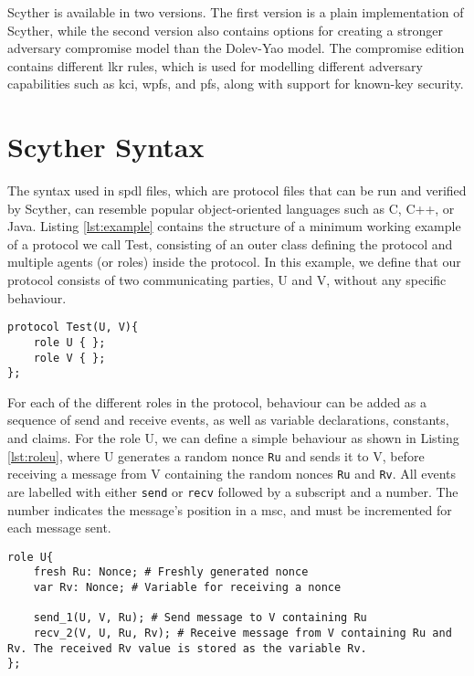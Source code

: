 Scyther is available in two versions. The first version is a plain implementation of Scyther, while the second version also contains options for creating a stronger adversary compromise model than the Dolev-Yao model. The compromise edition contains different \gls{lkr} rules, which is used for modelling different adversary capabilities such as \gls{kci}, \gls{wpfs}, and \gls{pfs}, along with support for known-key security. 


\section{Scyther Syntax}


The syntax used in \gls{spdl} files, which are protocol files that can be run and verified by Scyther, can resemble popular object-oriented languages such as C, C++, or Java. Listing \ref{lst:example} contains the structure of a minimum working example of a protocol we call Test, consisting of an outer class defining the protocol and multiple agents (or roles) inside the protocol. In this example, we define that our protocol consists of two communicating parties, U and V, without any specific behaviour.\newline

\begin{lstlisting}[caption={Example of the structure of a protocol modelled in Scyther, consisting of roles with different behaviours.}, label={lst:example}]
protocol Test(U, V){
	role U { };
	role V { };  
};
\end{lstlisting}

For each of the different roles in the protocol, behaviour can be added as a sequence of send and receive events, as well as variable declarations, constants, and claims. For the role U, we can define a simple behaviour as shown in Listing \ref{lst:roleu}, where U generates a random nonce \texttt{Ru} and sends it to V, before receiving a message from V containing the random nonces \texttt{Ru} and \texttt{Rv}. All events are labelled with either \texttt{send} or \texttt{recv} followed by a subscript and a number. The number indicates the message's position in a \gls{msc}, and must be incremented for each message sent.\newline

\newpage

\begin{lstlisting}[caption={Terms can be generated, sent, and received when communicating with other agents.}, label={lst:roleu}]
role U{
	fresh Ru: Nonce; # Freshly generated nonce
	var Rv: Nonce; # Variable for receiving a nonce
	
	send_1(U, V, Ru); # Send message to V containing Ru
	recv_2(V, U, Ru, Rv); # Receive message from V containing Ru and Rv. The received Rv value is stored as the variable Rv.
};
\end{lstlisting}



